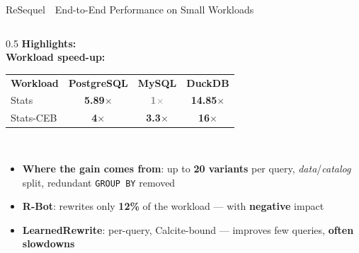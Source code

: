 \documentclass[aspectratio=169]{beamer}
\newcommand{\hred}[1]{\textcolor{tug}{\textbf{#1}}}
\newcommand{\hblue}[1]{\textcolor{tugb}{\textbf{#1}}}
\newcommand{\apptitle}[3]{%
  \textcolor{#1}{#2}~\textcolor{black!30}{\textbar}~#3}
\begin{document}
\begin{frame}{\apptitle{tug}{ReSequel}{End-to-End Performance on Small Workloads}}
\begin{columns}[T]
\begin{column}{0.5\textwidth}
  \fontsize{6.5}{7.8}\selectfont
  \vspace{2mm}
  \textbf{\textcolor{tug}{Highlights:}}\\[3pt]
  \textbf{Workload speed-up:}\\[1pt]
  {\fontsize{6.5}{7.8}\selectfont
   \setlength{\tabcolsep}{7pt}\renewcommand{\arraystretch}{1.15}%
   \begin{tabular}{@{}l c c c@{}}
     \rowcolor{tugb!16}
     \textbf{Workload} & \textbf{PostgreSQL} & \textbf{MySQL} & \textbf{DuckDB}\\
     \rowcolor{tugb!6}
     Stats     & \hblue{5.89$\times$} & \textcolor{gray}{\textbf{1$\times$}} & \hblue{14.85$\times$}\\
     Stats-CEB & \hblue{4$\times$}    & \hblue{3.3$\times$}                 & \hblue{16$\times$}\\
   \end{tabular}}\\[1mm]
  \setlength{\leftmargini}{1em}%
  \begin{itemize}\fontsize{6.5}{7.8}\selectfont
    \setlength\itemsep{2pt}\setlength\topsep{0pt}
    \item \textbf{Where the gain comes from}: up to \textbf{20 variants} per query,
          \emph{data}/\emph{catalog} split, redundant \texttt{GROUP BY} removed
    \item \textbf{R-Bot}: rewrites only \textbf{12\%} of the workload --- with
          \hred{negative} impact
    \item \textbf{LearnedRewrite}: per-query, Calcite-bound --- improves few
          queries, \hred{often slowdowns}
  \end{itemize}
\end{column}
\end{columns}
\end{frame}
\end{document}
